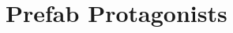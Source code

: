 \pagebreak
\section{Prefab Protagonists}
\label{sec:pfchars}


\pagebreak

\pagebreak

\pagebreak

\pagebreak